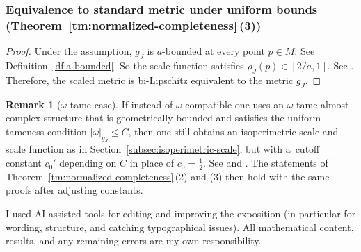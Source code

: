 \documentclass[10pt,a4paper]{amsart}
\numberwithin{equation}{section}
\theoremstyle{definition}
\newtheorem{rem}[Theorem]{Remark}
\begin{document}
\subsubsection[Equivalence to standard metric under uniform bounds (Theorem 1.16 (3))]{Equivalence to standard metric under uniform bounds (Theorem~\ref{tm:normalized-completeness}\,(3))}
\begin{proof}%
Under the assumption,
$g_J$ is $a$-bounded at every point $p\in M$. See Definition~\ref{df:a-bounded}. So the scale function satisfies $\rho_J(p)\in [2/a,1]$. See \cite[Lemma~4.10]{GromanFloerOpen}. Therefore, the scaled metric is bi-Lipschitz equivalent to the metric $g_J$.
\end{proof}

\begin{rem}[$\omega$-tame case]\label{rem:omega-tame}
If instead of $\omega$-compatible one uses an $\omega$-tame almost complex structure that is geometrically bounded and satisfies the uniform tameness condition $|\omega|_{g_J}\le C$, then one still obtains an isoperimetric scale and scale function as in Section~\ref{subsec:isoperimetric-scale}, but with a~cutoff constant $c_0'$ depending on $C$ in place of $c_0=\tfrac12$. See \cite[Section~4.4]{McDuffSalamonJHol} and \cite[Section~3, Appendix~B]{GromanWrappedSemiToricSYZ}. The statements of Theorem~\ref{tm:normalized-completeness}\,(2) and (3) then hold with the same proofs after adjusting constants.
\end{rem}

I used AI-assisted tools for editing and improving the exposition (in particular for wording, structure, and catching typographical issues).
All mathematical content, results, and any remaining errors are my own responsibility.
\end{document}
